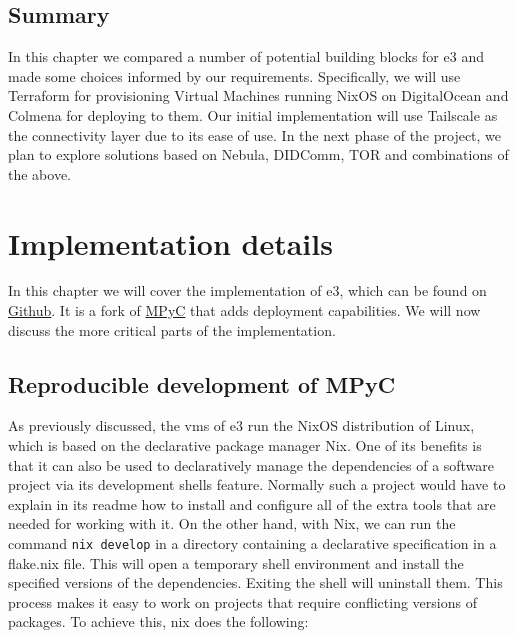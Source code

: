 \hypertarget{summary}{%
\section{Summary}\label{summary}}

In this chapter we compared a number of potential building blocks for
\gls{e3} and made some choices informed by our requirements.
Specifically, we will use Terraform for provisioning Virtual Machines
running NixOS on DigitalOcean and Colmena for deploying to them. Our
initial implementation will use Tailscale as the connectivity layer due
to its ease of use. In the next phase of the project, we plan to explore
solutions based on Nebula, DIDComm, TOR and combinations of the above.

\hypertarget{implementation-details}{%
\chapter{Implementation details}\label{implementation-details}}

In this chapter we will cover the implementation of \gls{e3}, which can
be found on \href{https://github.com/e-nikolov/mpyc}{Github}. It is a
fork of \href{https://github.com/lschoe/mpyc}{MPyC} that adds deployment
capabilities. We will now discuss the more critical parts of the
implementation.

\hypertarget{reproducible-development-of-mpyc}{%
\section{Reproducible development of
MPyC}\label{reproducible-development-of-mpyc}}

As previously discussed, the \glspl{vm} of \gls{e3} run the NixOS
distribution of Linux, which is based on the declarative package manager
Nix. One of its benefits is that it can also be used to declaratively
manage the dependencies of a software project via its development shells
feature. Normally such a project would have to explain in its readme how
to install and configure all of the extra tools that are needed for
working with it. On the other hand, with Nix, we can run the command
\texttt{nix\ develop} in a directory containing a declarative
specification in a flake.nix file. This will open a temporary shell
environment and install the specified versions of the dependencies.
Exiting the shell will uninstall them. This process makes it easy to
work on projects that require conflicting versions of packages. To
achieve this, nix does the following:

